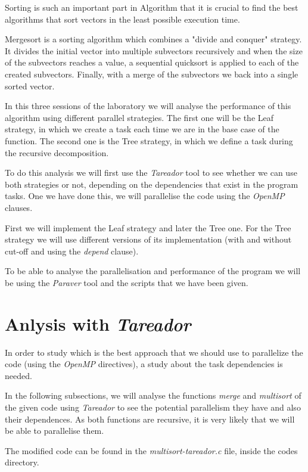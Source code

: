 \documentclass[12pt, a4paper]{article}
\begin{document}
Sorting is such an important part in Algorithm that it is crucial to find the best algorithms that sort vectors in the least possible execution time.

Mergesort is a sorting algorithm which combines a "divide and conquer" strategy. It divides the initial vector into multiple subvectors recursively and when the size of the subvectors reaches a value, a sequential quicksort is applied to each of the created subvectors. Finally, with a merge of the subvectors we back into a single sorted vector.

In this three sessions of the laboratory we will analyse the performance of this algorithm using different parallel strategies. The first one will be the Leaf strategy, in which we create a task each time we are in the base case of the function. The second one is the Tree strategy, in which we define a task during the recursive decomposition.

To do this analysis we will first use the \textit{Tareador} tool to see whether we can use both strategies or not, depending on the dependencies that exist in the program tasks. One we have done this, we will parallelise the code using the \textit{OpenMP} clauses.

First we will implement the Leaf strategy and later the Tree one. For the Tree strategy we will use different versions of its implementation (with and without cut-off and using the \textit{depend} clause).

To be able to analyse the parallelisation and performance of the program we will be using the \textit{Paraver} tool and the scripts that we have been given.

\newpage

\section{Anlysis with \textit{Tareador}}

In order to study which is the best approach that we should use to parallelize the code (using the \textit{OpenMP} directives), a study about the task dependencies is needed.

In the following subsections, we will analyse the functions \textit{merge} and \textit{multisort} of the given code using \textit{Tareador} to see the potential parallelism they have and also their dependences. As both functions are recursive, it is very likely that we will be able to parallelise them.

The modified code can be found in the \textit{multisort-tareador.c} file, inside the codes directory.
\end{document}
